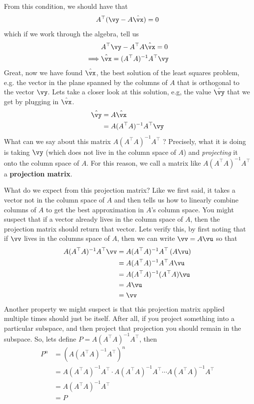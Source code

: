 \documentclass[a4paper,11pt]{exam}
\newcounter{ct}
\begin{document}
From this condition, we should have that
\begin{align}
    A^\top (\vy - A \hat{\vx}) = 0
\end{align}
which if we work through the algebra, tell us
\begin{align}
    &A^\top \vy - A^\top A \hat{\vx} = 0\\
    \implies &\hat{\vx} = (A^\top A)^{-1} A^\top \vy
\end{align}
Great, now we have found $\hat{\vx}$, the best solution of the least squares problem, e.g. the vector in the plane spanned by the columns of $A$ that is orthogonal to the vector $\vy$. Lets take a closer look at this solution, e.g, the value $\hat{\vy}$ that we get by plugging in $\hat{\vx}$.
\begin{align}
    \hat{\vy} &= A \hat{\vx}\\
    &= A (A^\top A)^{-1}A^\top \vy
\end{align}
What can we say about this matrix $A(A^\top A)^{-1} A^\top$ ? Precisely, what it is doing is taking $\vy$ (which does not live in the column space of $A$) and \textit{projecting} it onto the column space of $A$.  For this reason, we call a matrix like $A(A^\top A)^{-1} A^\top$ a \textbf{projection matrix}.  

What do we expect from this projection matrix? Like we first said, it takes a vector not in the column space of $A$ and then tells us how to linearly combine columns of $A$ to get the best approximation in $A$'s column space.  You might suspect that if a vector already lives in the column space of $A$, then the projection matrix should return that vector. Lets verify this, by first noting that if $\vv$ lives in the columns space of $A$, then we can write $\vv = A \vu$ so that
\begin{align}
    A(A^\top A)^{-1} A^\top \vv &= A(A^\top A)^{-1} A^\top \left( A \vu \right)\\
    &= A(A^\top A)^{-1} A^\top A \vu\\
    &= A (A^\top A)^{-1} (A^\top A) \vu\\
    &= A \vu\\
    &= \vv
\end{align}
Another property we might suspect is that this projection matrix applied multiple times should just be itself. After all, if you project something into a particular subspace, and then project that projection you should remain in the subspace.  So, lets define $P = A(A^\top A)^{-1} A^\top$, then
\begin{align}
    P^n &= \left( A(A^\top A)^{-1} A^\top \right)^n\\
    &= A(A^\top A)^{-1} A^\top \cdot A(A^\top A)^{-1} A^\top \cdots A(A^\top A)^{-1} A^\top\\
    &= A(A^\top A)^{-1} A^\top\\
    &= P
\end{align}
\end{document}
